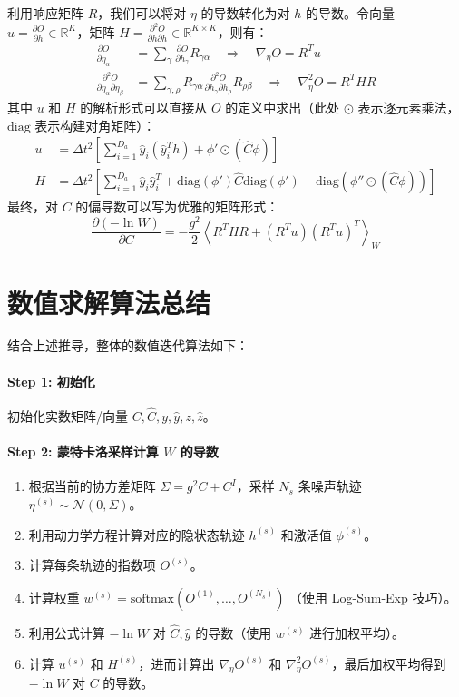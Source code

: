 \documentclass[UTF8]{ctexart}
\begin{document}
利用响应矩阵 $R$，我们可以将对 $\eta$ 的导数转化为对 $h$ 的导数。令向量 $u = \frac{\partial O}{\partial h} \in \mathbb{R}^K$，矩阵 $H = \frac{\partial^2 O}{\partial h \partial h} \in \mathbb{R}^{K \times K}$，则有：
\begin{align}
    \frac{\partial O}{\partial \eta_\alpha} &= \sum_\gamma \frac{\partial O}{\partial h_\gamma} R_{\gamma\alpha} \quad \Rightarrow \quad \nabla_\eta O = R^T u \\
    \frac{\partial^2 O}{\partial \eta_\alpha \partial \eta_\beta} &= \sum_{\gamma, \rho} R_{\gamma\alpha} \frac{\partial^2 O}{\partial h_\gamma \partial h_\rho} R_{\rho\beta} \quad \Rightarrow \quad \nabla^2_\eta O = R^T H R
\end{align}
其中 $u$ 和 $H$ 的解析形式可以直接从 $O$ 的定义中求出（此处 $\odot$ 表示逐元素乘法，$\text{diag}$ 表示构建对角矩阵）：
\begin{align}
    u &= \Delta t^2 \left[ \sum_{i=1}^{D_a} \hat{y}_i (\hat{y}_i^T h) + \phi' \odot (\hat{C} \phi) \right] \\
    H &= \Delta t^2 \left[ \sum_{i=1}^{D_a} \hat{y}_i \hat{y}_i^T + \text{diag}(\phi') \hat{C} \text{diag}(\phi') + \text{diag}\left( \phi'' \odot (\hat{C} \phi) \right) \right]
\end{align}
最终，对 $C$ 的偏导数可以写为优雅的矩阵形式：
\begin{equation}
    \frac{\partial (-\ln W)}{\partial C} = - \frac{g^2}{2} \left\langle R^T H R + (R^T u)(R^T u)^T \right\rangle_W
\end{equation}

\section{数值求解算法总结}

结合上述推导，整体的数值迭代算法如下：

\paragraph{Step 1: 初始化}
初始化实数矩阵/向量 $C, \hat{C}, y, \hat{y}, z, \hat{z}$。

\paragraph{Step 2: 蒙特卡洛采样计算 $W$ 的导数}
\begin{enumerate}
    \item 根据当前的协方差矩阵 $\Sigma = g^2 C + C^I$，采样 $N_s$ 条噪声轨迹 $\eta^{(s)} \sim \mathcal{N}(0, \Sigma)$。
    \item 利用动力学方程计算对应的隐状态轨迹 $h^{(s)}$ 和激活值 $\phi^{(s)}$。
    \item 计算每条轨迹的指数项 $O^{(s)}$。
    \item 计算权重 $w^{(s)} = \text{softmax}(O^{(1)}, \dots, O^{(N_s)})$ （使用 Log-Sum-Exp 技巧）。
    \item 利用公式计算 $-\ln W$ 对 $\hat{C}, \hat{y}$ 的导数（使用 $w^{(s)}$ 进行加权平均）。
    \item 计算 $u^{(s)}$ 和 $H^{(s)}$，进而计算出 $\nabla_\eta O^{(s)}$ 和 $\nabla^2_\eta O^{(s)}$，最后加权平均得到 $-\ln W$ 对 $C$ 的导数。
\end{enumerate}
\end{document}
